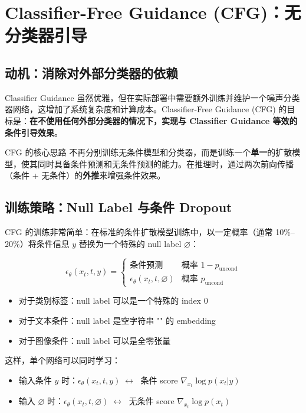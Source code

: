 \section{Classifier-Free Guidance (CFG)：无分类器引导}

\subsection{动机：消除对外部分类器的依赖}

Classifier Guidance 虽然优雅，但在实际部署中需要额外训练并维护一个噪声分类器网络，这增加了系统复杂度和计算成本。Classifier-Free Guidance (CFG) 的目标是：\textbf{在不使用任何外部分类器的情况下，实现与 Classifier Guidance 等效的条件引导效果}。

\begin{importantbox}{CFG 的核心思路}
不再分别训练无条件模型和分类器，而是训练一个\textbf{单一}的扩散模型，使其同时具备条件预测和无条件预测的能力。在推理时，通过两次前向传播（条件 + 无条件）的\textbf{外推}来增强条件效果。
\end{importantbox}

\subsection{训练策略：Null Label 与条件 Dropout}

CFG 的训练非常简单：在标准的条件扩散模型训练中，以一定概率（通常 10\%--20\%）将条件信息 $y$ 替换为一个特殊的 null label $\varnothing$：

$$
\epsilon_\theta(x_t, t, y) = \begin{cases}
\text{条件预测} & \text{概率 } 1-p_{\text{uncond}} \\
\epsilon_\theta(x_t, t, \varnothing) & \text{概率 } p_{\text{uncond}}
\end{cases}
$$

\begin{itemize}
    \item 对于类别标签：null label 可以是一个特殊的 index 0
    \item 对于文本条件：null label 是空字符串 ""  的 embedding
    \item 对于图像条件：null label 可以是全零张量
\end{itemize}

这样，单个网络可以同时学习：
\begin{itemize}
    \item 输入条件 $y$ 时：$\epsilon_\theta(x_t, t, y) \;\longleftrightarrow\;$ 条件 score $\nabla_{x_t}\log p(x_t|y)$
    \item 输入 $\varnothing$ 时：$\epsilon_\theta(x_t, t, \varnothing) \;\longleftrightarrow\;$ 无条件 score $\nabla_{x_t}\log p(x_t)$
\end{itemize}

